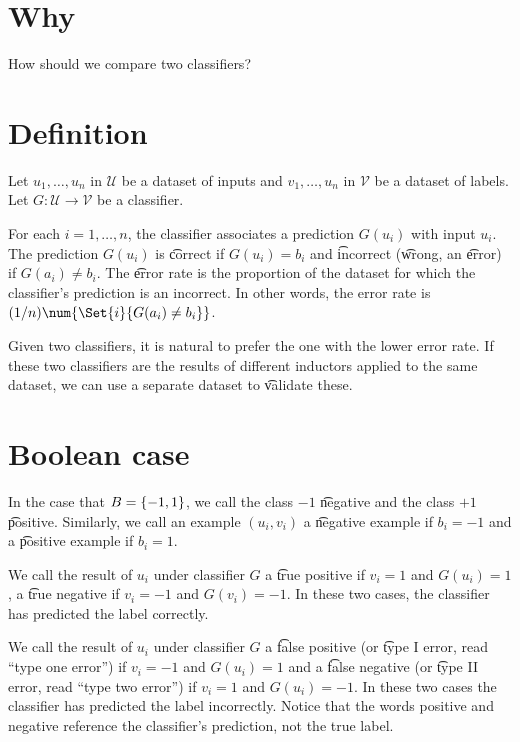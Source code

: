 

\section*{Why}

How should we compare two classifiers?

\section*{Definition}

Let $u_1, \dots , u_n$ in $\mathcal{U} $ be a dataset of inputs and $v_1, \dots , u_n$ in $\mathcal{V} $ be a dataset of labels.
Let $G: \mathcal{U}  \to \mathcal{V} $ be a classifier.

For each $i = 1, \dots , n$, the classifier associates a prediction $G(u_i)$ with input $u_i$.
The prediction $G(u_i)$ is \t{correct} if $G(u_i) = b_i$ and \t{incorrect} (\t{wrong}, an \t{error}) if $G(a_i) \neq b_i$.
The \t{error rate} is the proportion of the dataset for which the classifier's prediction is an incorrect.
In other words, the error rate is $(1/n)\num{\Set{i}{G(a_i) \neq b_i}}$.

Given two classifiers, it is natural to prefer the one with the lower error rate.
If these two classifiers are the results of different inductors applied to the same dataset, we can use a separate dataset to \t{validate} these.

\section*{Boolean case}

In the case that $B = \{-1, 1\}$, we call the class $-1$ \t{negative} and the class $+1$ \t{positive}.
Similarly, we call an example $(u_i, v_i)$ a \t{negative example} if $b_i = -1$ and a \t{positive example} if $b_i = 1$.

We call the result of $u_i$ under classifier $G$ a \t{true positive} if $v_i = 1$ and $G(u_i) = 1$, a \t{true negative} if $v_i = -1$ and $G(v_i) = -1$.
In these two cases, the classifier has predicted the label correctly.

We call the result of $u_i$ under classifier $G$ a \t{false positive} (or \t{type I error}, read ``type one error'') if $v_i = -1$ and $G(u_i) = 1$ and a \t{false negative} (or \t{type II error}, read ``type two error'') if $v_i = 1$ and $G(u_i) = -1$.
In these two cases the classifier has predicted the label incorrectly.
Notice that the words positive and negative reference the classifier's prediction, not the true label.

